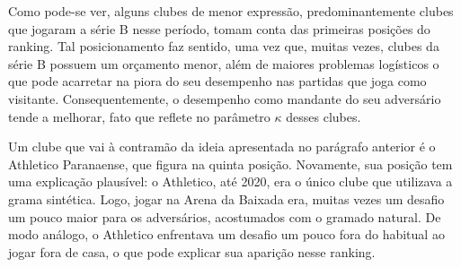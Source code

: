 Como pode-se ver, alguns clubes de menor expressão, predominantemente clubes que jogaram a série B nesse período, tomam conta das primeiras posições do ranking. Tal posicionamento faz sentido, uma vez que, muitas vezes, clubes da série B possuem um orçamento menor, além de maiores problemas logísticos o que pode acarretar na piora do seu desempenho nas partidas que joga como visitante. Consequentemente, o desempenho como mandante do seu adversário tende a melhorar, fato que reflete no parâmetro $\kappa$ desses clubes.

Um clube que vai à contramão da ideia apresentada no parágrafo anterior é o Athletico Paranaense, que figura na quinta posição. Novamente, sua posição tem uma explicação plausível: o Athletico, até 2020, era o único clube que utilizava a grama sintética. Logo, jogar na Arena da Baixada era, muitas vezes um desafio um pouco maior para os adversários, acostumados com o gramado natural. De modo análogo, o Athletico enfrentava um desafio um pouco fora do habitual ao jogar fora de casa, o que pode explicar sua aparição nesse ranking.